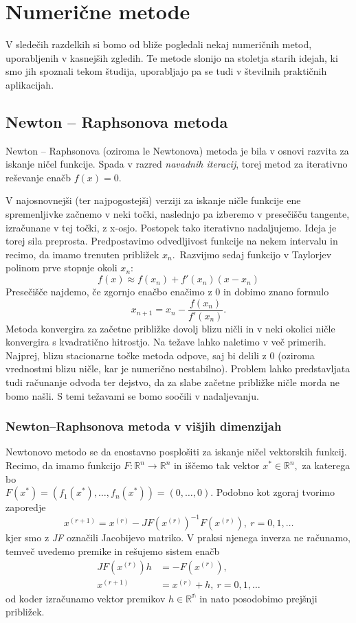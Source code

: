 \documentclass[12pt,a4paper]{amsart}
\theoremstyle{definition} %
\theoremstyle{plain} %
\begin{document}
\section{Numerične metode}
V sledečih razdelkih si bomo od bliže pogledali nekaj numeričnih metod, uporabljenih v kasnejših zgledih. Te metode slonijo na stoletja starih
idejah, ki smo jih spoznali tekom študija, uporabljajo pa se tudi v številnih praktičnih aplikacijah.
\subsection{Newton -- Raphsonova metoda} \label{nr}
Newton -- Raphsonova (oziroma le Newtonova) metoda je bila v osnovi razvita za iskanje ničel funkcije. Spada v razred \textit{navadnih iteracij}, torej metod za iterativno
reševanje enačb $f(x) = 0.$%

V najosnovnejši (ter najpogostejši) verziji za iskanje
ničle funkcije ene spremenljivke začnemo v neki točki, naslednjo pa izberemo v presečišču tangente, izračunane v 
tej točki, z x-osjo. Postopek tako iterativno nadaljujemo. Ideja je torej sila preprosta.
Predpostavimo odvedljivost funkcije na nekem intervalu in recimo, da imamo trenuten približek $x_{n}.$~Razvijmo sedaj funkcijo v Taylorjev
polinom prve stopnje okoli $x_{n}$:
\[
    f(x) \approx f(x_{n}) + f'(x_{n})(x - x_{n})
\]
Presečišče najdemo, če zgornjo enačbo enačimo z 0 in dobimo znano formulo
\[
    x_{n+1} = x_{n} - \frac{f(x_{n})}{f'(x_{n})}.
\]
Metoda konvergira za začetne približke dovolj blizu ničli in v neki okolici ničle konvergira s kvadratično hitrostjo. 
Na težave lahko naletimo v več primerih. Najprej, blizu stacionarne točke metoda odpove, saj bi delili z 0 (oziroma vrednostmi blizu ničle, kar je numerično nestabilno).
Problem lahko predstavljata tudi računanje odvoda ter dejstvo, da za slabe začetne približke ničle morda ne bomo našli. S temi 
težavami se bomo soočili v nadaljevanju.

\subsubsection{Newton--Raphsonova metoda v višjih dimenzijah}
Newtonovo metodo se da enostavno posplošiti za iskanje ničel vektorskih funkcij. Recimo, da imamo funkcijo $F:\mathbb{R}^{n} \rightarrow \mathbb{R}^{n}$ in iščemo tak
vektor $x^{*} \in \mathbb{R}^{n},$ za katerega bo \\ $F(x^{*}) = (f_{1}(x^{*}),\ldots,f_{n}(x^{*})) = (0,\ldots,0).$
Podobno kot zgoraj tvorimo zaporedje
\[
    x^{(r+1)} = x^{(r)} - JF(x^{(r)})^{-1}F(x^{(r)}),~r=0,1,\ldots
\]
kjer smo z \textit{JF} označili Jacobijevo matriko. V praksi njenega inverza ne računamo, temveč uvedemo premike in rešujemo sistem enačb
\begin{align*}
    JF(x^{(r)}) h &= -F(x^{(r)}),\\
    x^{(r+1)} &= x^{(r)} + h,~r=0,1,\ldots
\end{align*}
od koder izračunamo vektor premikov $h \in \mathbb{R^n}$ in nato posodobimo prejšnji približek.
\end{document}
